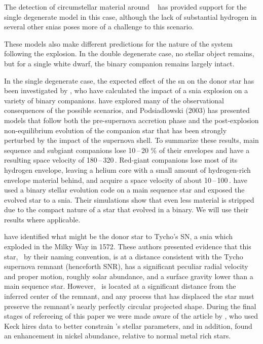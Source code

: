 The detection of circumstellar material around \
\citep{2007Sci...317..924P} has provided support for the single
degenerate model in this case, although the lack of substantial 
hydrogen in several other \glspl{snia} \citep{2007ApJ...670.1275L} 
poses more of a challenge to this scenario.

These models also make different predictions for the nature of the system
following the explosion. In the double degenerate case, no stellar
object remains, but for a single white dwarf, the binary
companion remains largely intact.

In the single degenerate case, the expected effect of the \gls{sn} on the
donor star has been investigated by \citet{2000ApJS..128..615M}, who
have calculated the impact of a \gls{snia} explosion on a variety of binary
companions. \citet{2001ApJ...550L..53C} have explored many of the
observational consequences of the possible scenarios, and
Podsiadlowski (2003) has presented models that follow both the
pre-supernova accretion phase and the post-explosion non-equilibrium
evolution of the companion star that has been strongly perturbed by
the impact of the supernova shell.  To summarize these results,
main sequence and subgiant companions lose 10\,--\,20 \% of their
envelopes and have a resulting space velocity of 180\,--\,320\,\kms . Red-giant companions lose most of its hydrogen envelope, leaving a
helium core with a small amount of hydrogen-rich envelope material behind,
and acquire a space velocity of about 10\,--\,100\,\kms.
\citet{2008A&A...489..943P} have used a binary stellar evolution code on a main sequence star and exposed the evolved star to a \gls{snia}. Their simulations show that even less material is stripped due to the compact nature of a star that evolved in a binary. We will use their results where applicable. 

\citet[henceforth \rl]{2004Natur.431.1069R} have identified what might
be the donor star to Tycho's SN, a \gls{snia} which exploded in the Milky
Way in 1572. These authors presented evidence that this star, \starg\
by their naming convention, is at a distance consistent with the Tycho
supernova remnant (henceforth SNR), has a significant peculiar radial
velocity and proper motion, roughly solar abundance, and a surface
gravity lower than a main sequence star. However, \starg\ is located at a significant distance from the
inferred center of the remnant, and any process that has displaced the
star must preserve the remnant's nearly perfectly circular projected shape. During the final stages of refereeing of this paper we were made aware of the article by \citet[henceforth \gh]{2009ApJ...691....1H}, who used Keck \gls{hires} data to better constrain \starg's stellar parameters, and in addition, found an enhancement in nickel abundance, relative to normal metal rich stars.

